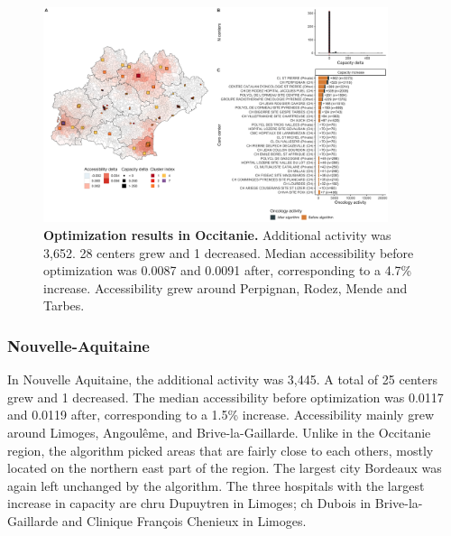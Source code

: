 \begin{figure}[h!]
    \includegraphics[width=0.9\textwidth]{images/camion/optim_region/optim_Occitanie.png}
    \centering
    \caption{ \textbf{Optimization results in Occitanie.} Additional activity
        was 3,652. 28 centers grew and 1 decreased. Median accessibility before
        optimization was 0.0087 and 0.0091 after, corresponding to a 4.7\%
        increase. Accessibility grew around Perpignan, Rodez, Mende and Tarbes.
    }
\end{figure}

\subsubsection{Nouvelle-Aquitaine}

In Nouvelle Aquitaine, the additional activity was 3,445. A total of 25 centers
grew and 1 decreased. The median accessibility before optimization was 0.0117 and
0.0119 after, corresponding to a 1.5\% increase. Accessibility mainly grew around
Limoges, Angoulême, and Brive-la-Gaillarde. Unlike in the Occitanie region,
the algorithm picked areas that are fairly close to each others, mostly located
on the northern east part of the region. The largest city Bordeaux was again
left unchanged by the algorithm. The three hospitals with the largest increase
in capacity are \ac{chru} Dupuytren in Limoges; \ac{ch} Dubois in
Brive-la-Gaillarde and Clinique François Chenieux in Limoges.

